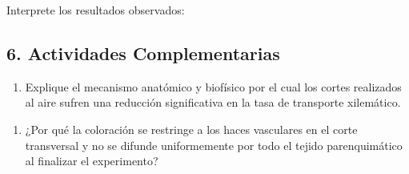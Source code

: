 \documentclass[
  spanish,
  10pt,
  letterpaper,
  twocolumn]{article}
\providecommand{\tightlist}{%
  \setlength{\itemsep}{0pt}\setlength{\parskip}{0pt}}
\begin{document}
\begin{center}
\end{center}

Interprete los resultados observados:

\hrulefill

\hrulefill

\hrulefill

\hrulefill

\hrulefill

\subsection{6. Actividades
Complementarias}\label{actividades-complementarias}

\begin{enumerate}
\def\labelenumi{\arabic{enumi}.}
\tightlist
\item
  Explique el mecanismo anatómico y biofísico por el cual los cortes
  realizados al aire sufren una reducción significativa en la tasa de
  transporte xilemático.
\end{enumerate}

\hrulefill

\hrulefill

\hrulefill

\hrulefill

\hrulefill

\hrulefill

\hrulefill

\hrulefill

\begin{enumerate}
\def\labelenumi{\arabic{enumi}.}
\setcounter{enumi}{1}
\tightlist
\item
  ¿Por qué la coloración se restringe a los haces vasculares en el corte
  transversal y no se difunde uniformemente por todo el tejido
  parenquimático al finalizar el experimento?
\end{enumerate}
\end{document}
